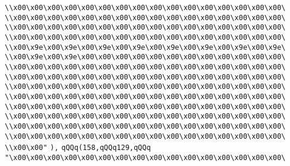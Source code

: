\verb|\\x00\x00\x00\x00\x00\x00\x00\x00\x00\x00\x00\x00\x00\x00\x00\x00\|\newline
\verb|\\x00\x00\x00\x00\x00\x00\x00\x00\x00\x00\x00\x00\x00\x00\x00\x00\|\newline
\verb|\\x00\x00\x00\x00\x00\x00\x00\x00\x00\x00\x00\x00\x00\x00\x00\x00\|\newline
\verb|\\x00\x00\x00\x00\x00\x00\x00\x00\x00\x00\x00\x00\x00\x00\x00\x00\|\newline
\verb|\\x00\x9e\x00\x9e\x00\x9e\x00\x9e\x00\x9e\x00\x9e\x00\x9e\x00\x9e\|\newline
\verb|\\x00\x9e\x00\x9e\x00\x00\x00\x00\x00\x00\x00\x00\x00\x00\x00\x00\|\newline
\verb|\\x00\x00\x00\x00\x00\x00\x00\x00\x00\x00\x00\x00\x00\x00\x00\x00\|\newline
\verb|\\x00\x00\x00\x00\x00\x00\x00\x00\x00\x00\x00\x00\x00\x00\x00\x00\|\newline
\verb|\\x00\x00\x00\x00\x00\x00\x00\x00\x00\x00\x00\x00\x00\x00\x00\x00\|\newline
\verb|\\x00\x00\x00\x00\x00\x00\x00\x00\x00\x00\x00\x00\x00\x00\x00\x00\|\newline
\verb|\\x00\x00\x00\x00\x00\x00\x00\x00\x00\x00\x00\x00\x00\x00\x00\x00\|\newline
\verb|\\x00\x00\x00\x00\x00\x00\x00\x00\x00\x00\x00\x00\x00\x00\x00\x00\|\newline
\verb|\\x00\x00\x00\x00\x00\x00\x00\x00\x00\x00\x00\x00\x00\x00\x00\x00\|\newline
\verb|\\x00\x00\x00\x00\x00\x00\x00\x00\x00\x00\x00\x00\x00\x00\x00\x00\|\newline
\verb|\\x00\x00"|\newline
\verb|),|\newline
\verb|qQQq(158,qQQq129,qQQq|\newline
\verb|"\x00\x00\x00\x00\x00\x00\x00\x00\x00\x00\x00\x00\x00\x00\x00\x00\|\newline
